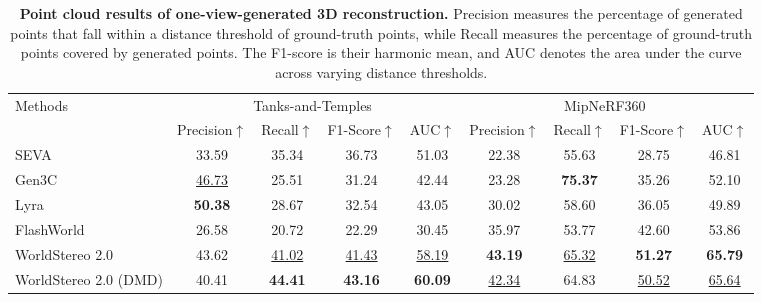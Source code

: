 \documentclass{article} %
\begin{document}
\begin{table}
\centering
\caption{\textbf{Point cloud results of one-view-generated 3D reconstruction.} 
Precision measures the percentage of generated points that fall within a distance threshold of ground-truth points, while Recall measures the percentage of ground-truth points covered by generated points. The F1-score is their harmonic mean, and AUC denotes the area under the curve across varying distance thresholds.
\label{tab:single_view_recon_exp}}
\fontsize{8.0}{9}\selectfont
\setlength{\tabcolsep}{5pt}
\begin{tabular}{lcccccccc}
\toprule
\multirow{2}{*}{Methods} & \multicolumn{4}{c}{Tanks-and-Temples~\cite{knapitsch2017tanks}} & \multicolumn{4}{c}{MipNeRF360~\cite{barron2022mip}}\tabularnewline
\cmidrule(lr){2-5}\cmidrule(lr){6-9}
 & Precision$\uparrow$ & Recall$\uparrow$ & F1-Score$\uparrow$ & AUC$\uparrow$ & Precision$\uparrow$ & Recall$\uparrow$ & F1-Score$\uparrow$ & AUC$\uparrow$\tabularnewline
\midrule
SEVA~\cite{zhou2025stable} & 33.59 & 35.34 & 36.73 & 51.03 & 22.38 & 55.63 & 28.75 & 46.81\tabularnewline
Gen3C~\cite{ren2025gen3c} & \underline{46.73} & 25.51 & 31.24 & 42.44 & 23.28 & \textbf{75.37} & 35.26 & 52.10\tabularnewline
Lyra~\cite{bahmani2025lyra} & \textbf{50.38} & 28.67 & 32.54 & 43.05 & 30.02 & 58.60 & 36.05 & 49.89\tabularnewline
FlashWorld~\cite{yang2025flash} & 26.58 & 20.72 & 22.29 & 30.45 & 35.97 & 53.77 & 42.60 & 53.86\tabularnewline
WorldStereo 2.0 & 43.62 & \underline{41.02} & \underline{41.43} & \underline{58.19} & \textbf{43.19} & \underline{65.32} & \textbf{51.27} & \textbf{65.79}\tabularnewline
WorldStereo 2.0 (DMD) & 40.41 & \textbf{44.41} & \textbf{43.16} & \textbf{60.09} & \underline{42.34} & 64.83 & \underline{50.52} & \underline{65.64}\tabularnewline
\bottomrule
\end{tabular}
\end{table}
 
\end{document}
